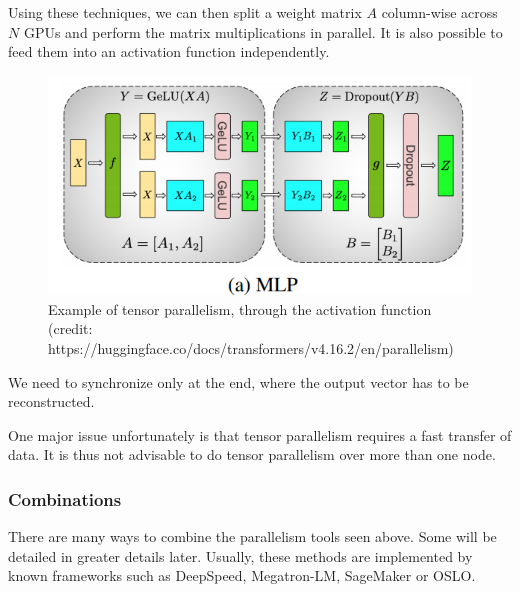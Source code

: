 \documentclass{article}
\begin{document}
Using these techniques, we can then split a weight matrix \(A\) column-wise across \(N\) GPUs and perform the matrix multiplications in parallel. It is also possible to feed them into an activation function independently.

\begin{figure}[h!]
  \center
  \includegraphics[width=0.5\linewidth]{images/2022-08-25-10-04-26.png}
  \caption{Example of tensor parallelism, through the activation function (credit: https://huggingface.co/docs/transformers/v4.16.2/en/parallelism)}
\end{figure}
\FloatBarrier

We need to synchronize only at the end, where the output vector has to be reconstructed.

One major issue unfortunately is that tensor parallelism requires a fast transfer of data. It is thus not advisable to do tensor parallelism over more than one node.

\subsubsection{Combinations}
There are many ways to combine the parallelism tools seen above. Some will be detailed in greater details later. Usually, these methods are implemented by known frameworks such as DeepSpeed, Megatron-LM, SageMaker or OSLO.
\end{document}
